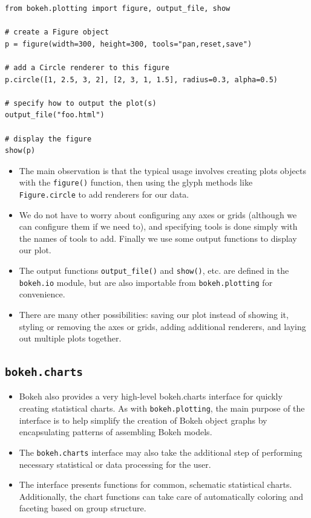 \documentclass[a4paper,12pt]{article}
\begin{document}
\begin{framed}
\begin{verbatim}
from bokeh.plotting import figure, output_file, show

# create a Figure object
p = figure(width=300, height=300, tools="pan,reset,save")

# add a Circle renderer to this figure
p.circle([1, 2.5, 3, 2], [2, 3, 1, 1.5], radius=0.3, alpha=0.5)

# specify how to output the plot(s)
output_file("foo.html")

# display the figure
show(p)
\end{verbatim}
\end{framed}
\begin{itemize}
\item The main observation is that the typical usage involves creating plots objects with the \texttt{figure()} function, then using the glyph methods like \texttt{Figure.circle} to add renderers for our data. 
\item We do not have to worry about configuring any axes or grids (although we can configure them if we need to), and specifying tools is done simply with the names of tools to add. Finally we use some output functions to display our plot.

\item The output functions \texttt{output\_file()} and \texttt{show()}, etc. are defined in the \texttt{bokeh.io} module, but are also importable from \texttt{bokeh.plotting} for convenience.


\item There are many other possibilities: saving our plot instead of showing it, styling or removing the axes or grids, adding additional renderers, and laying out multiple plots together.
\end{itemize}
 


\newpage
\subsection*{\texttt{bokeh.charts}}
\begin{itemize}
\item Bokeh also provides a very high-level bokeh.charts interface for quickly creating statistical charts. As with \texttt{bokeh.plotting}, the main purpose of the interface is to help simplify the creation of Bokeh object graphs by encapsulating patterns of assembling Bokeh models. 
\item The \texttt{bokeh.charts} interface may also take the additional step of performing necessary statistical or data processing for the user. 

\item The interface presents functions for common, schematic statistical charts. Additionally, the chart functions can take care of automatically coloring and faceting based on group structure.
\end{itemize}
\end{document}
